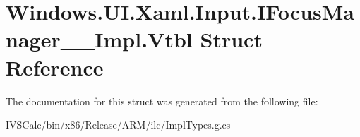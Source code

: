 \hypertarget{struct_windows_1_1_u_i_1_1_xaml_1_1_input_1_1_i_focus_manager_____impl_1_1_vtbl}{}\section{Windows.\+U\+I.\+Xaml.\+Input.\+I\+Focus\+Manager\+\_\+\+\_\+\+Impl.\+Vtbl Struct Reference}
\label{struct_windows_1_1_u_i_1_1_xaml_1_1_input_1_1_i_focus_manager_____impl_1_1_vtbl}


The documentation for this struct was generated from the following file\+:\begin{DoxyCompactItemize}
\item 
I\+V\+S\+Calc/bin/x86/\+Release/\+A\+R\+M/ilc/Impl\+Types.\+g.\+cs\end{DoxyCompactItemize}
